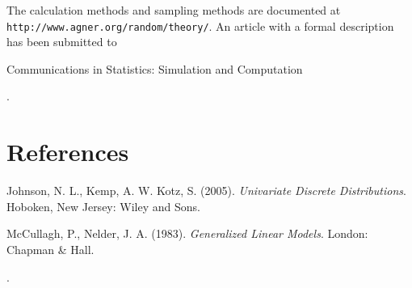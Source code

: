 \documentclass[a4paper]{article}
\begin{document}
The calculation methods and sampling methods are documented at \\
{\tt http://www.agner.org/random/theory/}. An article with a formal
description has been submitted to 
\begin{emph}{Communications in Statistics: Simulation and Computation}\end{emph}.

\section{References}

\noindent Johnson, N. L., Kemp, A. W. Kotz, S. (2005). {\it
Univariate Discrete Distributions}. Hoboken, New Jersey: Wiley and
Sons.

\vskip 3mm
%
\noindent McCullagh, P., Nelder, J. A. (1983). {\it Generalized
Linear Models}. London: Chapman \& Hall.

\vskip 3mm
%
.
\end{document}
